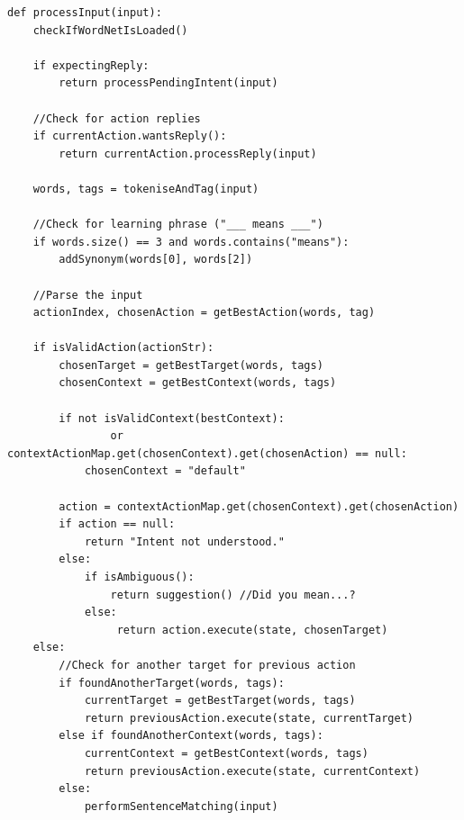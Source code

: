 \documentclass[11pt]{article}
\begin{document}
\begin{lstlisting}[caption=Pseudocode for processInput(), label={lst:voice-process-pseudo}]
def processInput(input):
    checkIfWordNetIsLoaded()
    
    if expectingReply:
        return processPendingIntent(input)
    
    //Check for action replies
    if currentAction.wantsReply():
        return currentAction.processReply(input)
    
    words, tags = tokeniseAndTag(input)
    
    //Check for learning phrase ("___ means ___")
    if words.size() == 3 and words.contains("means"):
        addSynonym(words[0], words[2])
    
    //Parse the input
    actionIndex, chosenAction = getBestAction(words, tag)
    
    if isValidAction(actionStr):
        chosenTarget = getBestTarget(words, tags)
        chosenContext = getBestContext(words, tags)
        
        if not isValidContext(bestContext):
                or contextActionMap.get(chosenContext).get(chosenAction) == null:
            chosenContext = "default"
            
        action = contextActionMap.get(chosenContext).get(chosenAction)
        if action == null:
            return "Intent not understood."
        else:
            if isAmbiguous():
                return suggestion()	//Did you mean...?
            else:
                 return action.execute(state, chosenTarget)
    else:
    	//Check for another target for previous action
        if foundAnotherTarget(words, tags):
            currentTarget = getBestTarget(words, tags)
            return previousAction.execute(state, currentTarget)
        else if foundAnotherContext(words, tags):
            currentContext = getBestContext(words, tags)
            return previousAction.execute(state, currentContext)
        else:
            performSentenceMatching(input)
\end{lstlisting}
\end{document}
